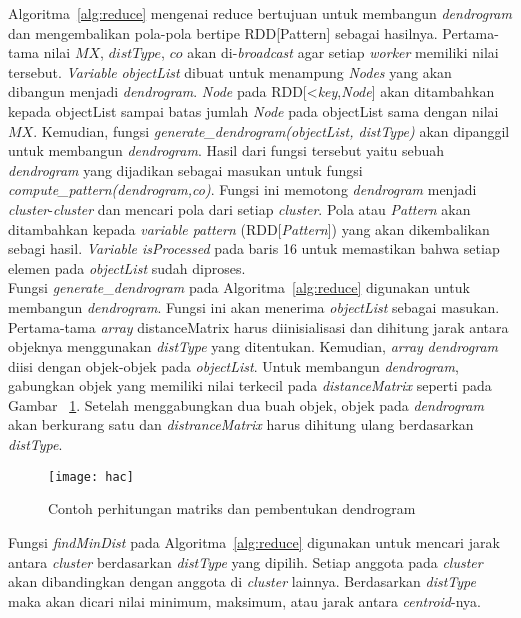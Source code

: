 Algoritma~\ref{alg:reduce} mengenai reduce bertujuan untuk membangun \textit{dendrogram} dan mengembalikan pola-pola bertipe RDD[Pattern] sebagai hasilnya. Pertama-tama nilai $MX$, $distType$, $co$ akan di-\textit{broadcast} agar setiap \textit{worker} memiliki nilai tersebut. \textit{Variable} \textit{objectList} dibuat untuk menampung \textit{Nodes} yang akan dibangun menjadi \textit{dendrogram}. \textit{Node} pada RDD[<\textit{key},\textit{Node}] akan ditambahkan kepada objectList sampai batas jumlah \textit{Node} pada objectList sama dengan nilai $MX$. Kemudian, fungsi \textit{generate\_dendrogram(objectList, distType)} akan dipanggil untuk membangun \textit{dendrogram}. Hasil dari fungsi tersebut yaitu sebuah \textit{dendrogram} yang dijadikan sebagai masukan untuk fungsi \textit{compute\_pattern(dendrogram,co)}. Fungsi ini memotong \textit{dendrogram} menjadi \textit{cluster}-\textit{cluster} dan mencari pola dari setiap \textit{cluster}. Pola atau \textit{Pattern} akan ditambahkan kepada \textit{variable pattern} (RDD[\textit{Pattern}]) yang akan dikembalikan sebagi hasil. \textit{Variable isProcessed} pada baris 16 untuk memastikan bahwa setiap elemen pada \textit{objectList} sudah diproses. \\


Fungsi \textit{generate}\_\textit{dendrogram} pada Algoritma~\ref{alg:reduce} digunakan untuk membangun \textit{dendrogram}. Fungsi ini akan menerima \textit{objectList} sebagai masukan. Pertama-tama \textit{array} distanceMatrix harus diinisialisasi dan dihitung jarak antara objeknya menggunakan \textit{distType} yang ditentukan. Kemudian, \textit{array} \textit{dendrogram} diisi dengan objek-objek pada \textit{objectList}. Untuk membangun \textit{dendrogram}, gabungkan objek yang memiliki nilai terkecil pada \textit{distanceMatrix} seperti pada Gambar ~\ref{fig:hac}. Setelah menggabungkan dua buah objek, objek pada \textit{dendrogram} akan berkurang satu dan \textit{distranceMatrix} harus dihitung ulang berdasarkan \textit{distType}.

\begin{figure}[H]
    \centering  
    \texttt{[image: hac]}  
    \caption[Contoh perhitungan matriks dan pembentukan dendrogram]{Contoh perhitungan matriks dan pembentukan dendrogram} 
    \label{fig:hac}
\end{figure}

Fungsi \textit{findMinDist} pada Algoritma~\ref{alg:reduce} digunakan untuk mencari jarak antara \textit{cluster} berdasarkan \textit{distType} yang dipilih. Setiap anggota pada \textit{cluster} akan dibandingkan dengan anggota di \textit{cluster} lainnya. Berdasarkan \textit{distType} maka akan dicari nilai minimum, maksimum, atau jarak antara \textit{centroid}-nya.\\

